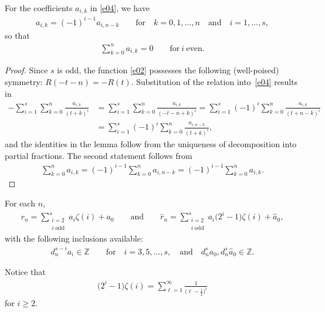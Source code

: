 \begin{lemma}\label{l2} For the coefficients $a_{i,k}$ in \eqref{e04}, we have
\begin{gather*}
a_{i,k}=(-1)^{i-1}a_{i,n-k} \qquad\text{for}\quad k=0,1,\dots,n \quad\text{and}\quad i=1,\dots,s,
\end{gather*}
so that
\begin{gather*}
\sum_{k=0}^na_{i,k}=0 \qquad\text{for} \ i \ \text{even}.
\end{gather*}
\end{lemma}

\begin{proof}
Since $s$ is odd, the function \eqref{e02} possesses the following (well-poised) symmetry: $R(-t-n)=-R(t)$. Substitution of the relation into~\eqref{e04} results in
\begin{align*}
-\sum_{i=1}^s\sum_{k=0}^n\frac{a_{i,k}}{(t+k)^i}
&=\sum_{i=1}^s\sum_{k=0}^n\frac{a_{i,k}}{(-t-n+k)^i}=\sum_{i=1}^s(-1)^i\sum_{k=0}^n\frac{a_{i,k}}{(t+n-k)^i}\\
&=\sum_{i=1}^s(-1)^i\sum_{k=0}^n\frac{a_{i,n-k}}{(t+k)^i},
\end{align*}
and the identities in the lemma follow from the uniqueness of decomposition into partial fractions. The second statement follows from
\begin{gather*}
\sum_{k=0}^na_{i,k}=(-1)^{i-1}\sum_{k=0}^na_{i,n-k}=(-1)^{i-1}\sum_{k=0}^na_{i,k}.\tag*{\qed}
\end{gather*}
\renewcommand{\qed}{}
\end{proof}

\begin{lemma}\label{l3} For each $n$,
\begin{gather*}
r_n=\sum_{\substack{i=2\\i\;\text{odd}}}^sa_i\zeta(i)+a_0
\qquad\text{and}\qquad
\hat r_n=\sum_{\substack{i=2\\i\;\text{odd}}}^sa_i\big(2^i-1\big)\zeta(i)+\hat a_0,
\end{gather*}
with the following inclusions available\textup:
\begin{gather*}
d_n^{s-i}a_i\in\mathbb Z \qquad\text{for}\quad i=3,5,\dots,s,
\quad\text{and}\quad d_n^sa_0, d_n^s\hat a_0\in\mathbb Z.
\end{gather*}
\end{lemma}

Notice that
\begin{gather*}
\big(2^i-1\big)\zeta(i) =\sum_{\ell=1}^\infty\frac1{\big(\ell-\frac12\big)^i}
\end{gather*}
for $i\ge2$.

